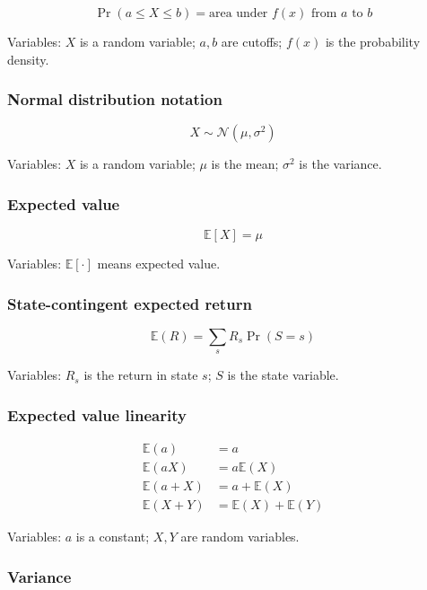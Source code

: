 \documentclass[
  8pt,
  twocolumn]{extarticle}
\begin{document}
\[
\Pr(a\le X\le b)=\text{area under }f(x)\text{ from }a\text{ to }b
\]

Variables: \(X\) is a random variable; \(a,b\) are cutoffs; \(f(x)\) is
the probability density.

\subsubsection{Normal distribution
notation}\label{normal-distribution-notation}

\[
X\sim\mathcal N(\mu,\sigma^2)
\]

Variables: \(X\) is a random variable; \(\mu\) is the mean; \(\sigma^2\)
is the variance.

\subsubsection{Expected value}\label{expected-value}

\[
\mathbb E[X]=\mu
\]

Variables: \(\mathbb E[\cdot]\) means expected value.

\subsubsection{State-contingent expected
return}\label{state-contingent-expected-return}

\[
\mathbb E(R)=\sum_s R_s\Pr(S=s)
\]

Variables: \(R_s\) is the return in state \(s\); \(S\) is the state
variable.

\subsubsection{Expected value linearity}\label{expected-value-linearity}

\[
\begin{aligned}
\mathbb E(a)&=a\\
\mathbb E(aX)&=a\mathbb E(X)\\
\mathbb E(a+X)&=a+\mathbb E(X)\\
\mathbb E(X+Y)&=\mathbb E(X)+\mathbb E(Y)
\end{aligned}
\]

Variables: \(a\) is a constant; \(X,Y\) are random variables.

\subsubsection{Variance}\label{variance}
\end{document}
